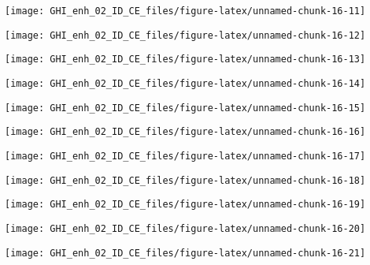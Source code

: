 \documentclass[
  10pt,
  a4paper,oneside]{article}
\begin{document}
\begin{center}\texttt{[image: GHI\_enh\_02\_ID\_CE\_files/figure-latex/unnamed-chunk-16-11]} \end{center}

\begin{center}\texttt{[image: GHI\_enh\_02\_ID\_CE\_files/figure-latex/unnamed-chunk-16-12]} \end{center}

\begin{center}\texttt{[image: GHI\_enh\_02\_ID\_CE\_files/figure-latex/unnamed-chunk-16-13]} \end{center}

\begin{center}\texttt{[image: GHI\_enh\_02\_ID\_CE\_files/figure-latex/unnamed-chunk-16-14]} \end{center}

\begin{center}\texttt{[image: GHI\_enh\_02\_ID\_CE\_files/figure-latex/unnamed-chunk-16-15]} \end{center}

\begin{center}\texttt{[image: GHI\_enh\_02\_ID\_CE\_files/figure-latex/unnamed-chunk-16-16]} \end{center}

\begin{center}\texttt{[image: GHI\_enh\_02\_ID\_CE\_files/figure-latex/unnamed-chunk-16-17]} \end{center}

\begin{center}\texttt{[image: GHI\_enh\_02\_ID\_CE\_files/figure-latex/unnamed-chunk-16-18]} \end{center}

\begin{center}\texttt{[image: GHI\_enh\_02\_ID\_CE\_files/figure-latex/unnamed-chunk-16-19]} \end{center}

\begin{center}\texttt{[image: GHI\_enh\_02\_ID\_CE\_files/figure-latex/unnamed-chunk-16-20]} \end{center}

\begin{center}\texttt{[image: GHI\_enh\_02\_ID\_CE\_files/figure-latex/unnamed-chunk-16-21]} \end{center}
\end{document}
